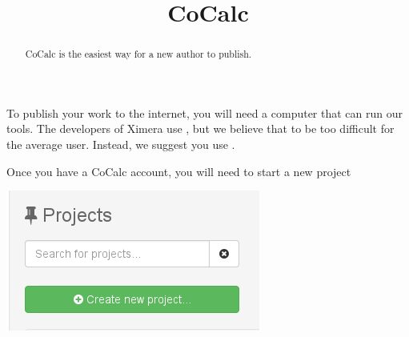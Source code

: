 \documentclass{ximera}
\title{CoCalc}
\begin{document}
\begin{abstract}
CoCalc is the easiest way for a new author to publish.
\end{abstract}
\maketitle

To publish your work to the internet, you will need a computer that
can run our tools. The developers of Ximera use , but we believe that to be too difficult for the average user. Instead, we suggest you use .

Once you have a CoCalc account, you will need to start a new project

\begin{image}
  \includegraphics{createNewProject.png}
\end{image}
\end{document}
